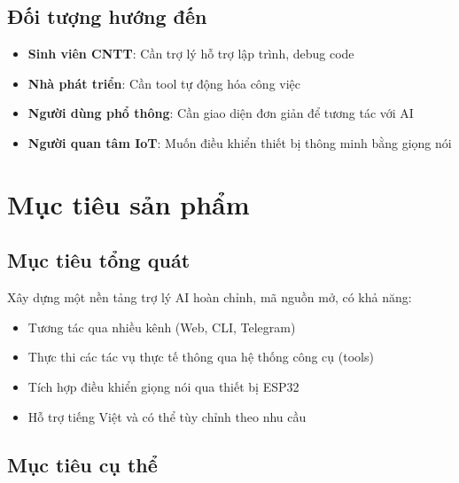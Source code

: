 \documentclass[12pt,a4paper]{article}
\begin{document}
\subsection{Đối tượng hướng đến}

\begin{itemize}
    \item \textbf{Sinh viên CNTT}: Cần trợ lý hỗ trợ lập trình, debug code
    \item \textbf{Nhà phát triển}: Cần tool tự động hóa công việc
    \item \textbf{Người dùng phổ thông}: Cần giao diện đơn giản để tương tác với AI
    \item \textbf{Người quan tâm IoT}: Muốn điều khiển thiết bị thông minh bằng giọng nói
\end{itemize}

\section{Mục tiêu sản phẩm}

\subsection{Mục tiêu tổng quát}

Xây dựng một nền tảng trợ lý AI hoàn chỉnh, mã nguồn mở, có khả năng:
\begin{itemize}
    \item Tương tác qua nhiều kênh (Web, CLI, Telegram)
    \item Thực thi các tác vụ thực tế thông qua hệ thống công cụ (tools)
    \item Tích hợp điều khiển giọng nói qua thiết bị ESP32
    \item Hỗ trợ tiếng Việt và có thể tùy chỉnh theo nhu cầu
\end{itemize}

\subsection{Mục tiêu cụ thể}
\end{document}
